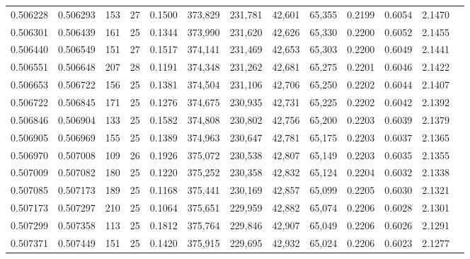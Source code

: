 \begin{tabular}{rrrrrrrrrrrrr}
0.506228 & 0.506293 & 153 &  27 &                                     0.1500 & 373,829 & 231,781 &  42,601 &  65,355 & 0.2199 & 0.6054 & 2.1470 \\
0.506301 & 0.506439 & 161 &  25 &                                     0.1344 & 373,990 & 231,620 &  42,626 &  65,330 & 0.2200 & 0.6052 & 2.1455 \\
0.506440 & 0.506549 & 151 &  27 &                                     0.1517 & 374,141 & 231,469 &  42,653 &  65,303 & 0.2200 & 0.6049 & 2.1441 \\
0.506551 & 0.506648 & 207 &  28 &                                     0.1191 & 374,348 & 231,262 &  42,681 &  65,275 & 0.2201 & 0.6046 & 2.1422 \\
0.506653 & 0.506722 & 156 &  25 &                                     0.1381 & 374,504 & 231,106 &  42,706 &  65,250 & 0.2202 & 0.6044 & 2.1407 \\
0.506722 & 0.506845 & 171 &  25 &                                     0.1276 & 374,675 & 230,935 &  42,731 &  65,225 & 0.2202 & 0.6042 & 2.1392 \\
0.506846 & 0.506904 & 133 &  25 &                                     0.1582 & 374,808 & 230,802 &  42,756 &  65,200 & 0.2203 & 0.6039 & 2.1379 \\
0.506905 & 0.506969 & 155 &  25 &                                     0.1389 & 374,963 & 230,647 &  42,781 &  65,175 & 0.2203 & 0.6037 & 2.1365 \\
0.506970 & 0.507008 & 109 &  26 &                                     0.1926 & 375,072 & 230,538 &  42,807 &  65,149 & 0.2203 & 0.6035 & 2.1355 \\
0.507009 & 0.507082 & 180 &  25 &                                     0.1220 & 375,252 & 230,358 &  42,832 &  65,124 & 0.2204 & 0.6032 & 2.1338 \\
0.507085 & 0.507173 & 189 &  25 &                                     0.1168 & 375,441 & 230,169 &  42,857 &  65,099 & 0.2205 & 0.6030 & 2.1321 \\
0.507173 & 0.507297 & 210 &  25 &                                     0.1064 & 375,651 & 229,959 &  42,882 &  65,074 & 0.2206 & 0.6028 & 2.1301 \\
0.507299 & 0.507358 & 113 &  25 &                                     0.1812 & 375,764 & 229,846 &  42,907 &  65,049 & 0.2206 & 0.6026 & 2.1291 \\
0.507371 & 0.507449 & 151 &  25 &                                     0.1420 & 375,915 & 229,695 &  42,932 &  65,024 & 0.2206 & 0.6023 & 2.1277 \\

\end{tabular}

